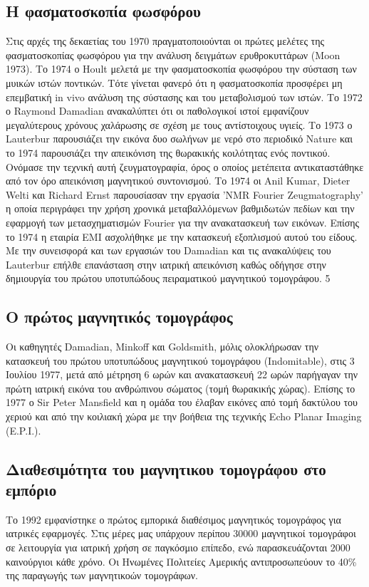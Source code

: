 \documentclass{article}
\begin{document}
\subsection{H φασματοσκοπία φωσφόρου}
Στις αρχές της δεκαετίας του 1970 πραγματοποιούνται οι πρώτες μελέτες της
φασματοσκοπίας φωσφόρου για την ανάλυση δειγμάτων ερυθροκυττάρων (Moon 1973). Το
1974 ο Hoult μελετά με την φασματοσκοπία φωσφόρου την σύσταση των μυικών ιστών
ποντικών. Τότε γίνεται φανερό ότι η φασματοσκοπία προσφέρει μη επεμβατική in vivo
ανάλυση της σύστασης και του μεταβολισμού των ιστών.
Το 1972 ο Raymond Damadian ανακαλύπτει ότι οι παθολογικοί ιστοί εμφανίζουν
μεγαλύτερους χρόνους χαλάρωσης σε σχέση με τους αντίστοιχους υγιείς. Το 1973 ο
Lauterbur παρουσιάζει την εικόνα δυο σωλήνων με νερό στο περιοδικό Nature και το 1974
παρουσιάζει την απεικόνιση της θωρακικής κοιλότητας ενός ποντικού. Ονόμασε την τεχνική
αυτή ζευγματογραφία, όρος ο οποίος μετέπειτα αντικαταστάθηκε από τον όρο απεικόνιση
μαγνητικού συντονισμού. Το 1974 οι Anil Kumar, Dieter Welti και Richard Ernst
παρουσίασαν την εργασία 'NMR Fourier Zeugmatography' η οποία περιγράφει την χρήση
χρονικά μεταβαλλόμενων βαθμιδωτών πεδίων και την εφαρμογή των μετασχηματισμών
Fourier για την ανακατασκευή των εικόνων. Επίσης το 1974 η εταιρία ΕΜΙ ασχολήθηκε με
την κατασκευή εξοπλισμού αυτού του είδους. Με την συνεισφορά και των εργασιών του
Damadian και τις ανακαλύψεις του Lauterbur επήλθε επανάσταση στην ιατρική απεικόνιση
καθώς οδήγησε στην δημιουργία του πρώτου υποτυπώδους πειραματικού μαγνητικού
τομογράφου.
5
\subsection{Ο πρώτος μαγνητικός τομογράφος}
Οι καθηγητές Damadian, Minkoff και Goldsmith, μόλις ολοκλήρωσαν την
κατασκευή του πρώτου υποτυπώδους μαγνητικού τομογράφου (Indomitable), στις 3 Ιουλίου
1977, μετά από μέτρηση 6 ωρών και ανακατασκευή 22 ωρών παρήγαγαν την πρώτη ιατρική
εικόνα του ανθρώπινου σώματος (τομή θωρακικής χώρας).
Επίσης το 1977 ο Sir Peter Mansfield και η ομάδα του έλαβαν εικόνες από τομή
δακτύλου του χεριού και από την κοιλιακή χώρα με την βοήθεια της τεχνικής Echo Planar
Imaging (E.P.I.).
\subsection{Διαθεσιμότητα του μαγνητικου τομογράφου στο εμπόριο}
Το 1992 εμφανίστηκε ο πρώτος εμπορικά διαθέσιμος μαγνητικός τομογράφος για
ιατρικές εφαρμογές. Στις μέρες μας υπάρχουν περίπου 30000 μαγνητικοί τομογράφοι σε
λειτουργία για ιατρική χρήση σε παγκόσμιο επίπεδο, ενώ παρασκευάζονται 2000 καινούργιοι
κάθε χρόνο. Οι Ηνωμένες Πολιτείες Αμερικής αντιπροσωπεύουν το 40\% της παραγωγής των
μαγνητικοών τομογράφων. 
\end{document}
